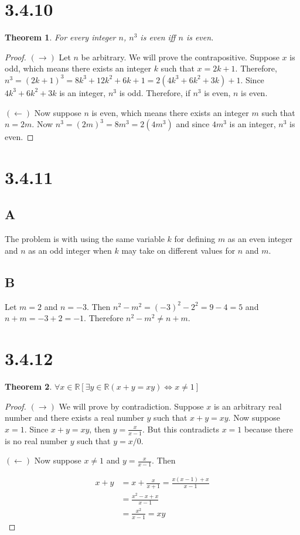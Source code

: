 \documentclass{article}
\newtheorem*{theorem}{Theorem}  %
\begin{document}
\section*{3.4.10}
\begin{theorem} For every integer $n$, $n^3$ is even iff $n$ is even.
\end{theorem}
\begin{proof}
$(\rightarrow)$ Let $n$ be arbitrary. We will prove the contrapositive. Suppose $x$ is odd, which means there exists an integer $k$ such that $x = 2k + 1$. Therefore, $n^3 = (2k + 1)^3 = 8k^3 + 12k^2 + 6k + 1 = 2(4k^3 + 6k^2 + 3k) + 1$. Since $4k^3 + 6k^2 + 3k$ is an integer, $n^3$ is odd. Therefore, if $n^3$ is even, $n$ is even.

$(\leftarrow)$ Now suppose $n$ is even, which means there exists an integer $m$ such that $n = 2m$. Now $n^3 = (2m)^3 = 8m^3 = 2(4m^3)$ and since $4m^3$ is an integer, $n^3$ is even.
\end{proof}

\section*{3.4.11}
\subsection*{A}
The problem is with using the same variable $k$ for defining $m$ as an even integer and $n$ as an odd integer when $k$ may take on different values for $n$ and $m$.

\subsection*{B}
Let $m = 2$ and $n = -3$. Then $n^2 - m^2 = (-3)^2 - 2^2 = 9 - 4 = 5$ and $n + m = -3 + 2 = -1$. Therefore $n^2 - m^2 \neq n + m$.


\section*{3.4.12}
\begin{theorem} $\forall x \in \mathbb{R}[\exists y \in \mathbb{R} (x + y = xy) \iff x \neq 1] $
\end{theorem}
\begin{proof}
$(\rightarrow)$ We will prove by contradiction. Suppose $x$ is an arbitrary real number and there exists a real number $y$ such that $x + y = xy$. Now suppose $x = 1$. Since $x + y = xy$, then $y = \tfrac{x}{x - 1}$. But this contradicts $x = 1$ because there is no real number $y$ such that $y = x/0$.

$(\leftarrow)$ Now suppose $x \neq 1$ and $y = \tfrac{x}{x-1}$. Then

\begin{align*}
x + y &= x + \frac{x}{x+1} = \frac{x(x-1) + x}{x-1} \\
&= \frac{x^2 - x + x}{x-1} \\
&= \frac{x^2}{x-1} = xy
\end{align*}
\end{proof}
\end{document}
